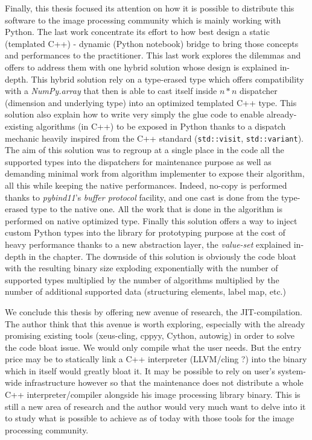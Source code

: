 Finally, this thesis focused its attention on how it is possible to distribute this software to the image processing
community which is mainly working with Python. The last work concentrate its effort to how best design a static
(templated C++) - dynamic (Python notebook) bridge to bring those concepts and performances to the practitioner. This
last work explores the dilemmas and offers to address them with one hybrid solution whose design is explained in-depth.
This hybrid solution rely on a type-erased type which offers compatibility with a \emph{NumPy.array} that then is able
to cast itself inside $n*n$ dispatcher (dimension and underlying type) into an optimized templated C++ type. This
solution also explain how to write very simply the glue code to enable already-existing algorithms (in C++) to be
exposed in Python thanks to a dispatch mechanic heavily inspired from the C++ standard (\texttt{std::visit},
\texttt{std::variant}). The aim of this solution was to regroup at a single place in the code all the supported types
into the dispatchers for maintenance purpose as well as demanding minimal work from algorithm implementer to expose
their algorithm, all this while keeping the native performances. Indeed, no-copy is performed thanks to
\emph{pybind11}'s \emph{buffer protocol} facility, and one cast is done from the type-erased type to the native one. All
the work that is done in the algorithm is performed on native optimized type. Finally this solution offers a way to
inject custom Python types into the library for prototyping purpose at the cost of heavy performance thanks to a new
abstraction layer, the \emph{value-set} explained in-depth in the chapter. The downside of this solution is obviously
the code bloat with the resulting binary size exploding exponentially with the number of supported types multiplied by
the number of algorithms multiplied by the number of additional supported data (structuring elements, label map, etc.)

We conclude this thesis by offering new avenue of research, the JIT-compilation. The author think that this avenue is
worth exploring, especially with the already promising existing tools (xeus-cling, cppyy, Cython, autowig) in order to
solve the code bloat issue. We would only compile what the user needs. But the entry price may be to statically link a
C++ interpreter (LLVM/cling ?) into the binary which in itself would greatly bloat it. It may be possible to rely on
user's system-wide infrastructure however so that the maintenance does not distribute a whole C++ interpreter/compiler
alongside his image processing library binary. This is still a new area of research and the author would very much want
to delve into it to study what is possible to achieve as of today with those tools for the image processing community.
